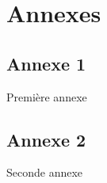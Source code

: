 \chapter{Annexes}

\section{Annexe 1}
\label{sec:annex-1}

Première annexe

\clearpage
\section{Annexe 2}
\label{sec:annex-2}

Seconde annexe


